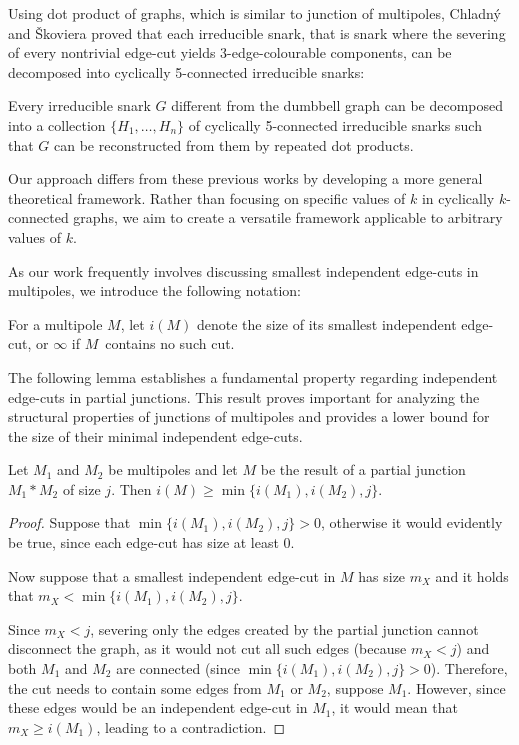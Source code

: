 \documentclass[12pt, twoside]{book}
\begin{document}
Using dot product of graphs, which is similar to junction of multipoles, Chladný and Škoviera \cite{Chladny2010} proved that each irreducible snark, that is snark where the severing of every nontrivial edge-cut yields 3-edge-colourable components, can be decomposed into cyclically 5-connected irreducible snarks:

\begin{theorem}
	Every irreducible snark $G$ different from the dumbbell graph can be decomposed into a collection $\{H_1, \dots , H_n\}$ of cyclically 5-connected irreducible snarks such that $G$ can be reconstructed from them by repeated dot products.
\end{theorem}

Our approach differs from these previous works by developing a more general theoretical framework. Rather than focusing on specific values of $k$ in cyclically \mbox{$k$-connected} graphs, we aim to create a versatile framework applicable to arbitrary values of $k$.

As our work frequently involves discussing smallest independent edge-cuts in multipoles, we introduce the following notation:

\begin{definition}
	For a multipole $M$, let $i(M)$ denote the size of its smallest independent edge-cut, or $\infty$ if $M$~contains no such cut.
\end{definition}

The following lemma establishes a fundamental property regarding independent edge-cuts in partial junctions. This result proves important for analyzing the structural properties of junctions of multipoles and provides a lower bound for the size of their minimal independent edge-cuts.

\begin{lemma}\label{lem:size-of-minimal-independent-after-junction}
	Let $M_1$ and $M_2$ be multipoles and let $M$ be the result of a partial junction $M_1*M_2$ of size $j$. Then $i(M)\geq \min\{i(M_1),i(M_2),j\}$.
\end{lemma}

\begin{proof}
	Suppose that $\min\{i(M_1),i(M_2),j\}>0$, otherwise it would evidently be true, since each edge-cut has size at least 0.
	
	Now suppose that a smallest independent edge-cut in $M$ has size $m_X$ and it holds that ${m_X<\min\{i(M_1),i(M_2),j\}}$.
	
	Since $m_X<j$, severing only the edges created by the partial junction cannot disconnect the graph, as it would not cut all such edges (because $m_X<j$) and both $M_1$ and $M_2$ are connected (since ${\min\{i(M_1),i(M_2),j\}>0}$). Therefore, the cut needs to contain some edges from $M_1$ or $M_2$, suppose $M_1$. However, since these edges would be an independent edge-cut in $M_1$, it would mean that $m_X\geq i(M_1)$, leading to a contradiction.
\end{proof}
\end{document}
